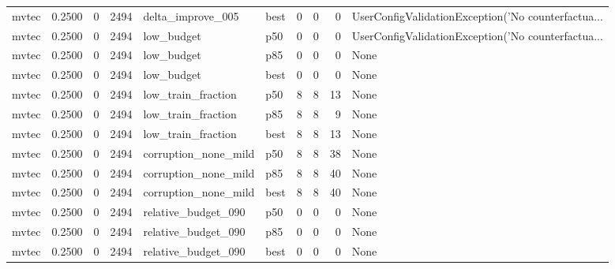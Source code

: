\begin{tabular}{lrrrllrrrl}
   mvtec &    0.2500 &    0 &   2494 &    delta\_improve\_005 &   best &               0 &          0 &       0 & UserConfigValidationException('No counterfactua... \\
   mvtec &    0.2500 &    0 &   2494 &           low\_budget &    p50 &               0 &          0 &       0 & UserConfigValidationException('No counterfactua... \\
   mvtec &    0.2500 &    0 &   2494 &           low\_budget &    p85 &               0 &          0 &       0 &                                               None \\
   mvtec &    0.2500 &    0 &   2494 &           low\_budget &   best &               0 &          0 &       0 &                                               None \\
   mvtec &    0.2500 &    0 &   2494 &   low\_train\_fraction &    p50 &               8 &          8 &      13 &                                               None \\
   mvtec &    0.2500 &    0 &   2494 &   low\_train\_fraction &    p85 &               8 &          8 &       9 &                                               None \\
   mvtec &    0.2500 &    0 &   2494 &   low\_train\_fraction &   best &               8 &          8 &      13 &                                               None \\
   mvtec &    0.2500 &    0 &   2494 & corruption\_none\_mild &    p50 &               8 &          8 &      38 &                                               None \\
   mvtec &    0.2500 &    0 &   2494 & corruption\_none\_mild &    p85 &               8 &          8 &      40 &                                               None \\
   mvtec &    0.2500 &    0 &   2494 & corruption\_none\_mild &   best &               8 &          8 &      40 &                                               None \\
   mvtec &    0.2500 &    0 &   2494 &  relative\_budget\_090 &    p50 &               0 &          0 &       0 &                                               None \\
   mvtec &    0.2500 &    0 &   2494 &  relative\_budget\_090 &    p85 &               0 &          0 &       0 &                                               None \\
   mvtec &    0.2500 &    0 &   2494 &  relative\_budget\_090 &   best &               0 &          0 &       0 &                                               None \\

\end{tabular}
